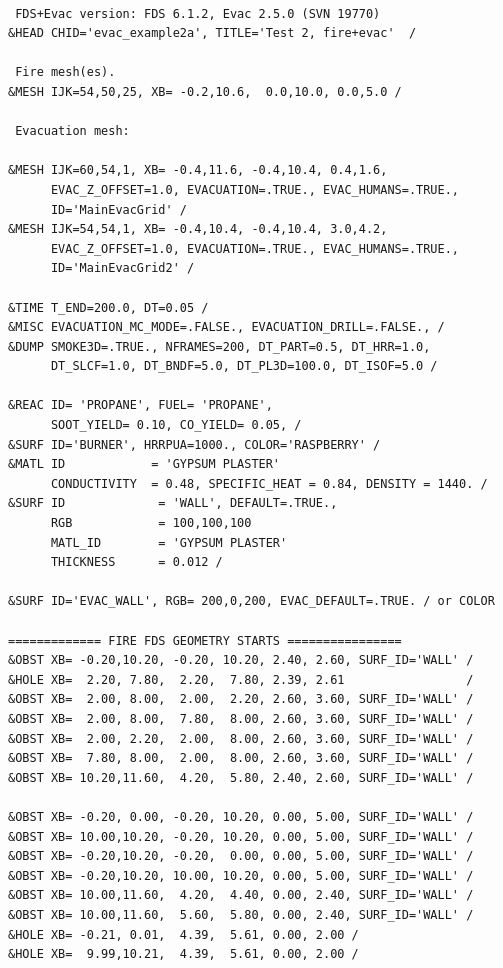 \documentclass[12pt,a4paper,final,twoside]{stylevk}
\begin{document}
{\fontsize{10}{13}
\selectfont
\begin{verbatim}

 FDS+Evac version: FDS 6.1.2, Evac 2.5.0 (SVN 19770)
&HEAD CHID='evac_example2a', TITLE='Test 2, fire+evac'  / 

 Fire mesh(es).
&MESH IJK=54,50,25, XB= -0.2,10.6,  0.0,10.0, 0.0,5.0 /

 Evacuation mesh:

&MESH IJK=60,54,1, XB= -0.4,11.6, -0.4,10.4, 0.4,1.6, 
      EVAC_Z_OFFSET=1.0, EVACUATION=.TRUE., EVAC_HUMANS=.TRUE., 
      ID='MainEvacGrid' /
&MESH IJK=54,54,1, XB= -0.4,10.4, -0.4,10.4, 3.0,4.2, 
      EVAC_Z_OFFSET=1.0, EVACUATION=.TRUE., EVAC_HUMANS=.TRUE.,
      ID='MainEvacGrid2' /

&TIME T_END=200.0, DT=0.05 / 
&MISC EVACUATION_MC_MODE=.FALSE., EVACUATION_DRILL=.FALSE., / 
&DUMP SMOKE3D=.TRUE., NFRAMES=200, DT_PART=0.5, DT_HRR=1.0,
      DT_SLCF=1.0, DT_BNDF=5.0, DT_PL3D=100.0, DT_ISOF=5.0 /

&REAC ID= 'PROPANE', FUEL= 'PROPANE',
      SOOT_YIELD= 0.10, CO_YIELD= 0.05, /
&SURF ID='BURNER', HRRPUA=1000., COLOR='RASPBERRY' /
&MATL ID            = 'GYPSUM PLASTER'
      CONDUCTIVITY  = 0.48, SPECIFIC_HEAT = 0.84, DENSITY = 1440. /
&SURF ID             = 'WALL', DEFAULT=.TRUE.,
      RGB            = 100,100,100
      MATL_ID        = 'GYPSUM PLASTER'
      THICKNESS      = 0.012 /

&SURF ID='EVAC_WALL', RGB= 200,0,200, EVAC_DEFAULT=.TRUE. / or COLOR

============= FIRE FDS GEOMETRY STARTS ================
&OBST XB= -0.20,10.20, -0.20, 10.20, 2.40, 2.60, SURF_ID='WALL' /
&HOLE XB=  2.20, 7.80,  2.20,  7.80, 2.39, 2.61                 /
&OBST XB=  2.00, 8.00,  2.00,  2.20, 2.60, 3.60, SURF_ID='WALL' /
&OBST XB=  2.00, 8.00,  7.80,  8.00, 2.60, 3.60, SURF_ID='WALL' /
&OBST XB=  2.00, 2.20,  2.00,  8.00, 2.60, 3.60, SURF_ID='WALL' /
&OBST XB=  7.80, 8.00,  2.00,  8.00, 2.60, 3.60, SURF_ID='WALL' /
&OBST XB= 10.20,11.60,  4.20,  5.80, 2.40, 2.60, SURF_ID='WALL' /

&OBST XB= -0.20, 0.00, -0.20, 10.20, 0.00, 5.00, SURF_ID='WALL' /
&OBST XB= 10.00,10.20, -0.20, 10.20, 0.00, 5.00, SURF_ID='WALL' /
&OBST XB= -0.20,10.20, -0.20,  0.00, 0.00, 5.00, SURF_ID='WALL' /
&OBST XB= -0.20,10.20, 10.00, 10.20, 0.00, 5.00, SURF_ID='WALL' /
&OBST XB= 10.00,11.60,  4.20,  4.40, 0.00, 2.40, SURF_ID='WALL' /
&OBST XB= 10.00,11.60,  5.60,  5.80, 0.00, 2.40, SURF_ID='WALL' /
&HOLE XB= -0.21, 0.01,  4.39,  5.61, 0.00, 2.00 / 
&HOLE XB=  9.99,10.21,  4.39,  5.61, 0.00, 2.00 / 


\end{verbatim}}
\end{document}
